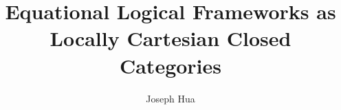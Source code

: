 \documentclass{article}
\newcommand{\<}{\langle}
\renewcommand{\>}{\rangle}
\theoremstyle{definitionstyle}
\theoremstyle{exercisestyle}
\theoremstyle{remarkstyle}
\begin{document}
\title{Equational Logical Frameworks as Locally Cartesian Closed Categories}
\author{Joseph Hua}
\maketitle

\tableofcontents










{}

\end{document}
